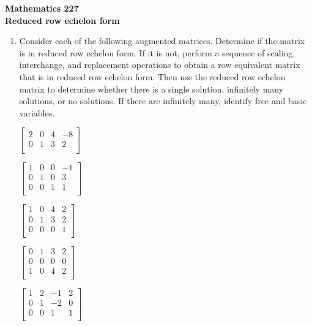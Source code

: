 \documentclass[12pt]{article}
\newcommand{\ds}{\displaystyle}
\newcommand{\vs}[1]{\vspace{#1in}}
\begin{document}
\noindent
{\bf Mathematics 227} \\ 
{\bf Reduced row echelon form}

\bigskip
\begin{enumerate}
\item Consider each of the following augmented matrices.  Determine if
  the matrix is in reduced row echelon form.  If it is not, perform a
  sequence of scaling, interchange, and replacement operations to
  obtain a row equivalent matrix that is in reduced row echelon form.
  Then use the reduced row echelon matrix to determine whether there
  is a single solution, infinitely many solutions, or no solutions.
  If there are infinitely many, identify free and basic variables.

  \bigskip
  $\ds
  \left[
    \begin{array}{rrr|r}
      2 & 0 & 4 & -8 \\
      0 & 1 & 3 & 2 \\
    \end{array}
  \right]
  $
  
  \vs{2}
  
  $\ds
  \left[
    \begin{array}{rrr|r}
      1 & 0 & 0 & -1 \\
      0 & 1 & 0 & 3 \\
      0 & 0 & 1 & 1 \\
    \end{array}
  \right]
  $
  
  \vs{2}
  $\ds
  \left[
    \begin{array}{rrr|r}
      1 & 0 & 4 & 2 \\
      0 & 1 & 3 & 2 \\
      0 & 0 & 0 & 1 \\
    \end{array}
  \right]
  $
  
  \vs{2}
  
  $
  \left[
    \begin{array}{rrr|r}
      0 & 1 & 3 & 2 \\
      0 & 0 & 0 & 0 \\
      1 & 0 & 4 & 2 \\
    \end{array}
  \right]
  $
  
  \vs{2}
  $\ds
  \left[
    \begin{array}{rrr|r}
      1 & 2 & -1 & 2 \\
      0 & 1 & -2 & 0 \\
      0 & 0 & 1 & 1 \\
    \end{array}
  \right]
  $


\end{enumerate}
\end{document}
